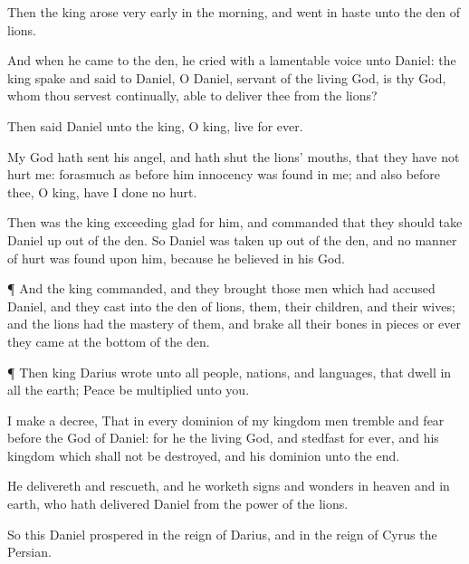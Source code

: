 {Then the
king
arose very
early in the
morning, and
went in
haste unto the
den of
lions.

And when he
came to the
den, he
cried with a
lamentable
voice unto
Daniel:
{} the
king
spake and
said to
Daniel, O
Daniel,
servant of the
living
God, is thy
God, whom thou
servest
continually,
able to
deliver thee
from the
lions?

Then
said
Daniel
unto the
king, O
king,
live for
ever.

My
God hath
sent his
angel, and hath
shut the
lions’
mouths, that they have
not
hurt me: forasmuch
as
before him
innocency was
found in me; and
also
before thee, O
king, have I
done
no
hurt.

Then was the
king
exceeding
glad for
him, and
commanded that they should
take
Daniel
up out
of the
den. So
Daniel was taken
up out
of the
den, and
no
manner of
hurt was
found upon him, because he
believed in his
God.


\par }{\PP {}¶ And the
king
commanded, and they
brought
those
men which had
accused
Daniel, and they
cast
{} into the
den of
lions,
them, their
children, and their
wives; and the
lions had the
mastery of them, and
brake
all their
bones in
pieces or
ever they
came at the
bottom of the
den.


\par }{\PP {}¶
Then
king
Darius
wrote unto
all
people,
nations, and
languages, that
dwell in
all the
earth;
Peace be
multiplied unto you.

I
make a
decree, That in
every
dominion of my
kingdom men
tremble and
fear
before the
God of
Daniel: for he
{} the
living
God, and
stedfast for
ever, and his
kingdom
{} which shall
not be
destroyed, and his
dominion
{}
unto the
end.

He
delivereth and
rescueth, and he
worketh
signs and
wonders in
heaven and in
earth, who hath
delivered
Daniel
from the
power of the
lions.

So
this
Daniel
prospered in the
reign of
Darius, and in the
reign of
Cyrus the
Persian.




\par }
